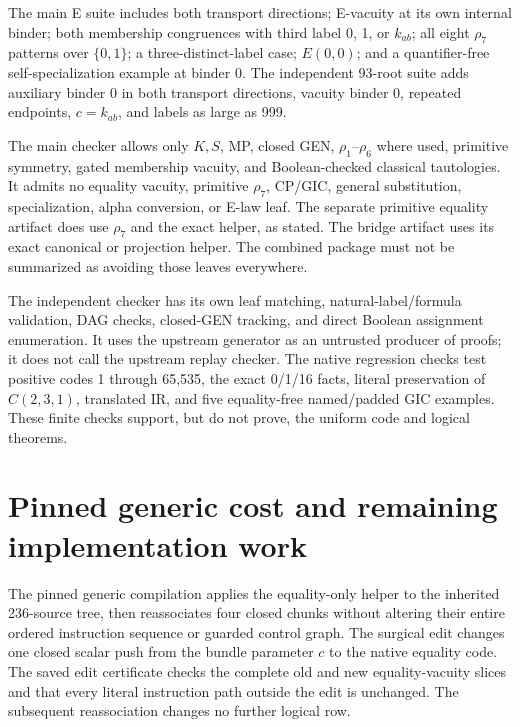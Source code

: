 \documentclass[11pt,letterpaper]{article}
\theoremstyle{definition}\newtheorem{definition}[theorem]{Definition}
\theoremstyle{remark}\newtheorem{remark}[theorem]{Remark}
\begin{document}
The main E suite includes both transport directions; E-vacuity at its own internal binder; both membership congruences with third label 0, 1, or $k_{ab}$; all eight $\rho_7$ patterns over $\{0,1\}$; a three-distinct-label case; $E(0,0)$; and a quantifier-free self-specialization example at binder 0. The independent 93-root suite adds auxiliary binder 0 in both transport directions, vacuity binder 0, repeated endpoints, $c=k_{ab}$, and labels as large as 999.

The main checker allows only $K,S$, MP, closed GEN, $\rho_1$--$\rho_6$ where used, primitive symmetry, gated membership vacuity, and Boolean-checked classical tautologies. It admits no equality vacuity, primitive $\rho_7$, CP/GIC, general substitution, specialization, alpha conversion, or E-law leaf. The separate primitive equality artifact does use $\rho_7$ and the exact helper, as stated. The bridge artifact uses its exact canonical or projection helper. The combined package must not be summarized as avoiding those leaves everywhere.

The independent checker has its own leaf matching, natural-label/formula validation, DAG checks, closed-GEN tracking, and direct Boolean assignment enumeration. It uses the upstream generator as an untrusted producer of proofs; it does not call the upstream replay checker. The native regression checks test positive codes 1 through 65,535, the exact 0/1/16 facts, literal preservation of $C(2,3,1)$, translated IR, and five equality-free named/padded GIC examples. These finite checks support, but do not prove, the uniform code and logical theorems.

\section{Pinned generic cost and remaining implementation work}\label{sec:cost}
The pinned generic compilation applies the equality-only helper to the inherited 236-source tree, then reassociates four closed chunks without altering their entire ordered instruction sequence or guarded control graph. The surgical edit changes one closed scalar push from the bundle parameter $c$ to the native equality code. The saved edit certificate checks the complete old and new equality-vacuity slices and that every literal instruction path outside the edit is unchanged. The subsequent reassociation changes no further logical row.
\end{document}
